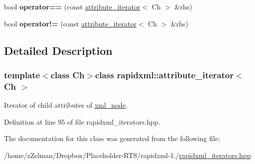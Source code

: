 \begin{DoxyCompactItemize}
\item 
\hypertarget{classrapidxml_1_1attribute__iterator_ab1dc8dd11d21e145a4e3f76d46aead0d}{bool {\bfseries operator==} (const \hyperlink{classrapidxml_1_1attribute__iterator}{attribute\-\_\-iterator}$<$ Ch $>$ \&rhs)}\label{classrapidxml_1_1attribute__iterator_ab1dc8dd11d21e145a4e3f76d46aead0d}

\item 
\hypertarget{classrapidxml_1_1attribute__iterator_a39e8cf336c324521fd9c720abf280d88}{bool {\bfseries operator!=} (const \hyperlink{classrapidxml_1_1attribute__iterator}{attribute\-\_\-iterator}$<$ Ch $>$ \&rhs)}\label{classrapidxml_1_1attribute__iterator_a39e8cf336c324521fd9c720abf280d88}

\end{DoxyCompactItemize}


\subsection{Detailed Description}
\subsubsection*{template$<$class Ch$>$class rapidxml\-::attribute\-\_\-iterator$<$ Ch $>$}

Iterator of child attributes of \hyperlink{classrapidxml_1_1xml__node}{xml\-\_\-node}. 

Definition at line 95 of file rapidxml\-\_\-iterators.\-hpp.



The documentation for this class was generated from the following file\-:\begin{DoxyCompactItemize}
\item 
/home/z\-Zelman/\-Dropbox/\-Placeholder-\/\-R\-T\-S/rapidxml-\/1./\hyperlink{rapidxml__iterators_8hpp}{rapidxml\-\_\-iterators.\-hpp}\end{DoxyCompactItemize}
